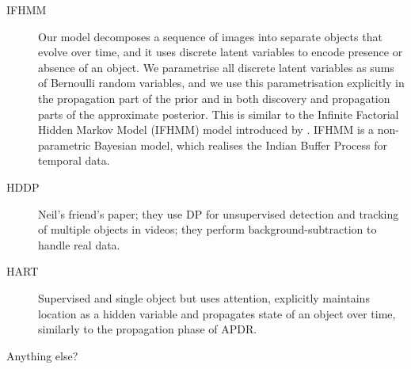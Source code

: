 \begin{description}
    \item[IFHMM]
    Our model decomposes a sequence of images into separate objects that evolve over time, and it uses discrete latent variables to encode presence or absence of an object. We parametrise all discrete latent variables as sums of Bernoulli random variables, and we use this parametrisation explicitly in the propagation part of the prior and in both discovery and propagation parts of the approximate posterior. This is similar to the Infinite Factorial Hidden Markov Model (IFHMM) model introduced by \cite{Gael2009}. IFHMM is a non-parametric Bayesian model, which realises the Indian Buffer Process for temporal data. 
    
    \item[HDDP] Neil's friend's paper; they use DP for unsupervised detection and tracking of multiple objects in videos; they perform background-subtraction to handle real data.
    
    \item[HART] 
    Supervised and single object but uses attention, explicitly maintains location as a hidden variable and propagates state of an object over time, similarly to the propagation phase of APDR.
    
    \item[Anything else?]
\end{description}
